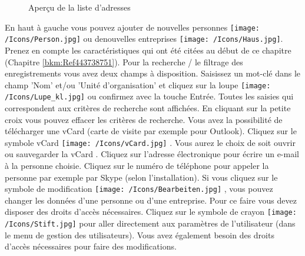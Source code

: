 \begin{figure}[H]
\caption{Aperçu de la liste d'adresses}
\end{figure}

En haut à gauche vous pouvez ajouter de nouvelles personnes \texttt{[image: /Icons/Person.jpg]} ou denouvelles entreprises \texttt{[image: /Icons/Haus.jpg]}. Prenez en compte les caractéristiques qui ont été citées au début de ce chapitre (Chapitre \ref{bkm:Ref443738751}). \newline
Pour la recherche / le filtrage des enregistrements vous avez deux champs à disposition. Saisissez un mot-clé dans le champ 'Nom' et/ou 'Unité d'organisation'  et cliquez sur la loupe \texttt{[image: /Icons/Lupe\_kl.jpg]}  ou confirmez avec la touche Entrée. Toutes les saisies qui correspondent aux critères de recherche sont affichées. En cliquant sur la petite croix  vous pouvez effacer les critères de recherche. \newline
Vous avez la possibilité de télécharger une vCard (carte de visite par exemple pour Outlook). Cliquez sur le symbole vCard \texttt{[image: /Icons/vCard.jpg]} . Vous aurez le choix de soit ouvrir 
ou sauvegarder la vCard .\newline
Cliquez sur l'adresse électronique  pour écrire un e-mail à la personne choisie. Cliquez sur le numéro de téléphone  pour appeler la personne par exemple par Skype (selon l'installation).\newline
Si vous cliquez sur le symbole de modification \texttt{[image: /Icons/Bearbeiten.jpg]} , vous pouvez changer les données d'une personne ou d'une entreprise. Pour ce faire vous devez disposer des droits d'accès nécessaires. Cliquez sur le symbole de crayon \texttt{[image: /Icons/Stift.jpg]}  pour aller directement aux paramètres de l'utilisateur (dans le menu de gestion des utilisateurs). Vous avez également besoin des droits d'accès nécessaires pour faire des modifications.

